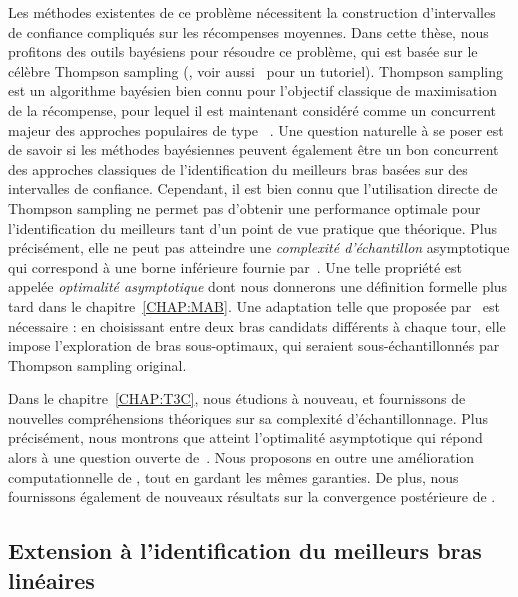 Les méthodes existentes de ce problème nécessitent la construction d'intervalles de confiance compliqués sur les récompenses moyennes. Dans cette thèse, nous profitons des outils bayésiens pour résoudre ce problème, qui est basée sur le célèbre Thompson sampling (\citealt{thompson1933}, voir aussi~\citealt{russo2018} pour un tutoriel). Thompson sampling est un algorithme bayésien bien connu pour l'objectif classique de maximisation de la récompense, pour lequel il est maintenant considéré comme un concurrent majeur des approches populaires de type \UCB{}~\citep{auer2002ucb}. Une question naturelle à se poser est de savoir si les méthodes bayésiennes peuvent également être un bon concurrent des approches classiques de l'identification du meilleurs bras basées sur des intervalles de confiance. Cependant, il est bien connu que l'utilisation directe de Thompson sampling ne permet pas d'obtenir une performance optimale pour l'identification du meilleurs tant d'un point de vue pratique que théorique. Plus précisément, elle ne peut pas atteindre une \emph{complexité d'échantillon} asymptotique qui correspond à une borne inférieure fournie par~\cite{garivier2016tracknstop}. Une telle propriété est appelée \emph{optimalité asymptotique} dont nous donnerons une définition formelle plus tard dans le chapitre~\ref{CHAP:MAB}. Une adaptation telle que \TTTS{} proposée par~\cite{russo2016ttts} est nécessaire : en choisissant entre deux bras candidats différents à chaque tour, elle impose l'exploration de bras sous-optimaux, qui seraient sous-échantillonnés par Thompson sampling original. 

Dans le chapitre~\ref{CHAP:T3C}, nous \'etudions \TTTS{} \`a nouveau, et fournissons de nouvelles compréhensions théoriques sur sa complexité d'échantillonnage. Plus précisément, nous montrons que \TTTS{} atteint l'optimalité asymptotique qui répond alors à une question ouverte de~\cite{russo2016ttts}. Nous proposons en outre une amélioration computationnelle \TCC{} de \TTTS{}, tout en gardant les mêmes garanties. De plus, nous fournissons également de nouveaux résultats sur la convergence postérieure de \TTTS{}.

\subsection{Extension \`a l'identification du meilleurs bras lin\'eaires}\label{sec:abs.mab.linear}

